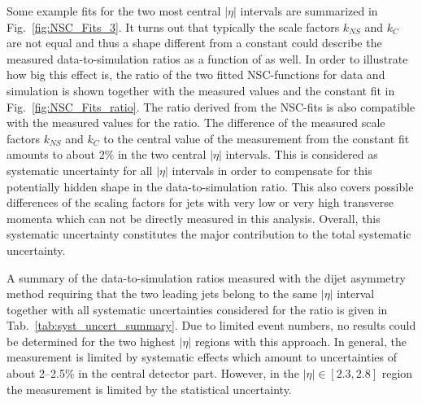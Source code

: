 \begin{description}
Some example fits for the two most central $|\eta|$ intervals are summarized in Fig.~\ref{fig:NSC_Fits_3}. It turns out that typically the scale factors $k_{NS}$ and $k_{C}$ are not equal and thus a shape different from a constant could describe the measured data-to-simulation ratios as a function of \ptave as well. In order to illustrate how big this effect is, the ratio of the two fitted NSC-functions for data and simulation is shown together with the measured values and the constant fit in Fig.~\ref{fig:NSC_Fits_ratio}. The ratio derived from the NSC-fits is also compatible with the measured values for the ratio. The difference of the measured scale factors $k_{NS}$ and $k_{C}$ to the central value of the measurement from the constant fit amounts to about $2\%$ in the two central $|\eta|$ intervals. This is considered as systematic uncertainty for all $|\eta|$ intervals in order to compensate for this potentially hidden shape in the data-to-simulation ratio. This also covers possible differences of the scaling factors for jets with very low or very high transverse momenta which can not be directly measured in this analysis. Overall, this systematic uncertainty constitutes the major contribution to the total systematic uncertainty.
\end{description}
A summary of the data-to-simulation ratios measured with the dijet asymmetry method requiring that the two leading jets belong to the same $|\eta|$ interval together with all systematic uncertainties considered for the ratio is given in Tab.~\ref{tab:syst_uncert_summary}. Due to limited event numbers, no results could be determined for the two highest $|\eta|$ regions with this approach. In general, the measurement is limited by systematic effects which amount to uncertainties of about 2--2.5\% in the central detector part. However, in the $|\eta| \in [2.3, 2.8]$ region the measurement is limited by the statistical uncertainty.   

